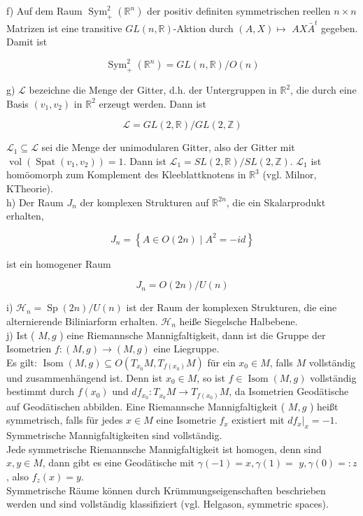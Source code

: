 \documentclass[10pt, letterpaper]{article}
\begin{document}
f) Auf dem Raum $\operatorname{Sym}_{+}^{2}\left(\mathbb{R}^{n}\right)$ der positiv definiten symmetrischen reellen $n \times n$ Matrizen ist eine transitive $G L(n, \mathbb{R})$-Aktion durch $(A, X) \mapsto$ $A X \bar{A}^{t}$ gegeben. Damit ist

$$
\operatorname{Sym}_{+}^{2}\left(\mathbb{R}^{n}\right)=G L(n, \mathbb{R}) / O(n)
$$

g) $\mathcal{L}$ bezeichne die Menge der Gitter, d.h. der Untergruppen in $\mathbb{R}^{2}$, die durch eine Basis $\left(v_{1}, v_{2}\right)$ in $\mathbb{R}^{2}$ erzeugt werden. Dann ist

$$
\mathcal{L}=G L(2, \mathbb{R}) / G L(2, \mathbb{Z})
$$

$\mathcal{L}_{1} \subseteq \mathcal{L}$ sei die Menge der unimodularen Gitter, also der Gitter mit $\operatorname{vol}\left(\operatorname{Spat}\left(v_{1}, v_{2}\right)\right)=1$. Dann ist $\mathcal{L}_{1}=S L(2, \mathbb{R}) / S L(2, \mathbb{Z})$. $\mathcal{L}_{1}$ ist homöomorph zum Komplement des Kleeblattknotens in $\mathbb{R}^{3}$ (vgl. Milnor, KTheorie).\\
h) Der Raum $J_{n}$ der komplexen Strukturen auf $\mathbb{R}^{2 n}$, die ein Skalarprodukt erhalten,

$$
J_{n}=\left\{A \in O(2 n) \mid A^{2}=-i d\right\}
$$

ist ein homogener Raum

$$
J_{n}=O(2 n) / U(n)
$$

i) $\mathcal{H}_{n}=\operatorname{Sp}(2 n) / U(n)$ ist der Raum der komplexen Strukturen, die eine alternierende Biliniarform erhalten. $\mathcal{H}_{n}$ heiße Siegelsche Halbebene.\\
j) Ist ( $M, g$ ) eine Riemannsche Mannigfaltigkeit, dann ist die Gruppe der Isometrien $f:(M, g) \rightarrow(M, g)$ eine Liegruppe.\\
Es gilt: $\operatorname{Isom}(M, g) \subseteq O\left(T_{x_{0}} M, T_{f\left(x_{0}\right)} M\right)$ für ein $x_{0} \in M$, falls $M$ vollständig und zusammenhängend ist. Denn ist $x_{0} \in M$, so ist $f \in \operatorname{Isom}(M, g)$ vollständig bestimmt durch $f\left(x_{0}\right)$ und $d f_{x_{0}}: T_{x_{0}} M \rightarrow T_{f\left(x_{0}\right)} M$, da Isometrien Geodätische auf Geodätischen abbilden. Eine Riemannsche Mannigfaltigkeit ( $M, g$ ) heißt symmetrisch, falls für jedes $x \in M$ eine Isometrie $f_{x}$ existiert mit $\left.d f_{x}\right|_{x}=-1$. Symmetrische Mannigfaltigkeiten sind vollständig.\\
Jede symmetrische Riemannsche Mannigfaltigkeit ist homogen, denn sind $x, y \in M$, dann gibt es eine Geodätische mit $\gamma(-1)=x, \gamma(1)=$ $y, \gamma(0)=: z$, also $f_{z}(x)=y$.\\
Symmetrische Räume können durch Krümmungseigenschaften beschrieben werden und sind vollständig klassifiziert (vgl. Helgason, symmetric spaces).
\end{document}
